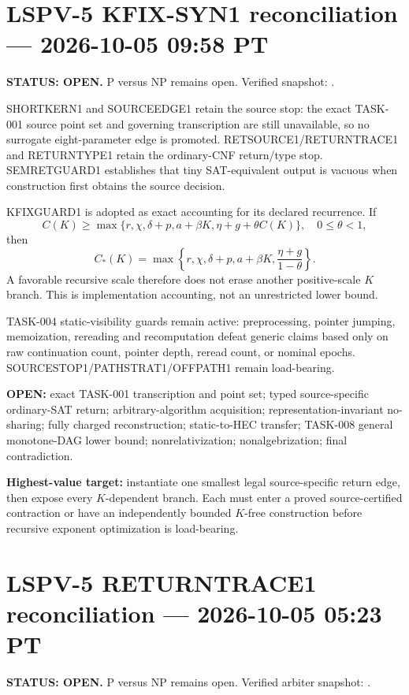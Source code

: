 \documentclass[11pt]{article}
\begin{document}
\clearpage

\section{LSPV-5 KFIX-SYN1 reconciliation --- 2026-10-05 09:58 PT}
\textbf{STATUS: OPEN.} P versus NP remains open. Verified snapshot:
.

SHORTKERN1 and SOURCEEDGE1 retain the source stop: the exact TASK-001 source point set and governing transcription are still unavailable, so no surrogate eight-parameter edge is promoted. RETSOURCE1/RETURNTRACE1 and RETURNTYPE1 retain the ordinary-CNF return/type stop. SEMRETGUARD1 establishes that tiny SAT-equivalent output is vacuous when construction first obtains the source decision.

KFIXGUARD1 is adopted as exact accounting for its declared recurrence. If
\[
C(K)\ge\max\{r,\chi,\delta+p,a+\beta K,\eta+g+\theta C(K)\},\quad 0\le\theta<1,
\]
then
\[
C_*(K)=\max\left\{r,\chi,\delta+p,a+\beta K,\frac{\eta+g}{1-\theta}\right\}.
\]
A favorable recursive scale therefore does not erase another positive-scale \(K\) branch. This is implementation accounting, not an unrestricted lower bound.

TASK-004 static-visibility guards remain active: preprocessing, pointer jumping, memoization, rereading and recomputation defeat generic claims based only on raw continuation count, pointer depth, reread count, or nominal epochs. SOURCESTOP1/PATHSTRAT1/OFFPATH1 remain load-bearing.

\textbf{OPEN:} exact TASK-001 transcription and point set; typed source-specific ordinary-SAT return; arbitrary-algorithm acquisition; representation-invariant no-sharing; fully charged reconstruction; static-to-HEC transfer; TASK-008 general monotone-DAG lower bound; nonrelativization; nonalgebrization; final contradiction.

\textbf{Highest-value target:} instantiate one smallest legal source-specific return edge, then expose every \(K\)-dependent branch. Each must enter a proved source-certified contraction or have an independently bounded \(K\)-free construction before recursive exponent optimization is load-bearing.


\section{LSPV-5 RETURNTRACE1 reconciliation --- 2026-10-05 05:23 PT}
\textbf{STATUS: OPEN.} P versus NP remains open. Verified arbiter snapshot:
.
\end{document}
